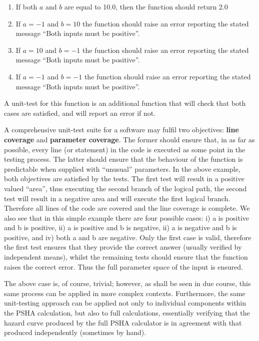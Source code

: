 \begin{enumerate}
\item If both $a$ and $b$ are equal to 10.0, then the function 
    should return 2.0
\item If $a = -1$ and $b = 10$ the function should raise an error 
    reporting the stated message ``Both inputs must be positive''.
\item If $a = 10$ and $b = -1$ the function should raise an error 
    reporting the stated message ``Both inputs must be positive''.
\item If $a = -1$ and $b = -1$ the function should raise an error 
    reporting the stated message ``Both inputs must be positive''.
\end{enumerate}

A unit-test for this function is an additional function that will 
check that both cases are satisfied, and will report an error if not. 

A comprehensive unit-test suite for a software may fulfil two objectives: 
\textbf{line coverage} and \textbf{parameter coverage}. The former should 
ensure that, in as far as possible, every line (or statement) in the code 
is executed as some point in the testing process. The latter should ensure
that the behaviour of the function is predictable when supplied with 
``unusual'' parameters. In the above example, both objectives are satisfied
by the tests. The first test will result in a positive valued ``area'',
thus executing the second branch of the logical path, the second test will
result in a negative area and will execute the first logical branch. 
%
Therefore all lines of the code are covered and the line coverage is 
complete. We also see that in this simple example there are four possible
cases: i) a is positive and b is positive, ii) a is positive and b is 
negative,  ii) a is negative and b is positive, and iv) both a and b 
are negative. Only the first case is valid, therefore the first test 
ensures that they provide the correct answer (usually verified by 
independent means), whilst the remaining tests should ensure that 
the function raises the correct error. Thus the full parameter space 
of the input is ensured.

The above case is, of course, trivial; however, as shall be seen in due
course, this same process can be applied in more complex contexts. 
%
Furthermore, the same unit-testing approach can be applied not only 
to individual components within the PSHA calculation, but also to 
full calculations, essentially verifying that the hazard curve 
produced by the full PSHA calculator is in agreement with that 
produced independently (sometimes by hand).
%
